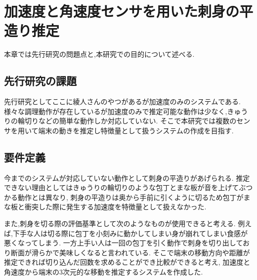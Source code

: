 \section{加速度と角速度センサを用いた刺身の平造り推定}
本章では先行研究の問題点と,本研究での目的について述べる.
\subsection{先行研究の課題}
先行研究として{ここに綾人さんのやつ}があるが加速度のみのシステムである.
様々な調理動作が存在しているが加速度のみで推定可能な動作は少なく,きゅうりの輪切りなどの簡単な動作しか対応していない.
そこで本研究では複数のセンサを用いて端末の動きを推定し特徴量として扱うシステムの作成を目指す.
\subsection{要件定義}
今までのシステムが対応していない動作として刺身の平造りがあげられる.
推定できない理由としてはきゅうりの輪切りのような包丁とまな板が音を上げてぶつかる動作とは異なり,
刺身の平造りは奥から手前に引くように切るため包丁がまな板と衝突した際に発生する加速度を特徴量として扱えなかった.

また,刺身を切る際の評価基準として次のようなものが使用できると考える.
例えば,下手な人は切る際に包丁を小刻みに動かしてしまい身が崩れてしまい食感が悪くなってしまう.
一方上手い人は一回の包丁を引く動作で刺身を切り出しており断面が滑らかで美味しくなると言われている.
そこで端末の移動方向や距離が推定できれば切り込んだ回数を求めることができ比較ができると考え,
加速度と角速度から端末の3次元的な移動を推定するシステムを作成した.


